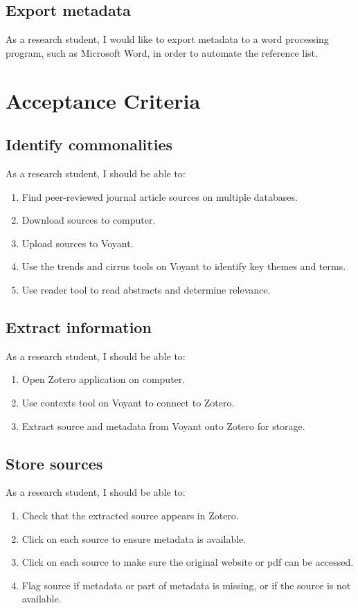 \documentclass{article}
\begin{document}
\subsection{Export metadata}
As a research student, I would like to export metadata to a word processing program, such as Microsoft Word, in order to automate the reference list. 

\section{Acceptance Criteria}
\subsection{Identify commonalities}
As a research student, I should be able to:
\begin{enumerate}
    \item Find peer-reviewed journal article sources on multiple databases.
    \item Download sources to computer.
    \item Upload sources to Voyant.
    \item Use the trends and cirrus tools on Voyant to identify key themes and terms.
    \item Use reader tool to read abstracts and determine relevance.
\end{enumerate}
\subsection{Extract information}
As a research student, I should be able to:
\begin{enumerate}
    \item Open Zotero application on computer.
    \item Use contexts tool on Voyant to connect to Zotero.
    \item Extract source and metadata from Voyant onto Zotero for storage.
   \end{enumerate}
\subsection{Store sources}
As a research student, I should be able to:
\begin{enumerate}
    \item Check that the extracted source appears in Zotero.
    \item Click on each source to ensure metadata is available.
    \item Click on each source to make sure the original website or pdf can be accessed.
    \item Flag source if metadata or part of metadata is missing, or if the source is not available.
\end{enumerate}
\end{document}
